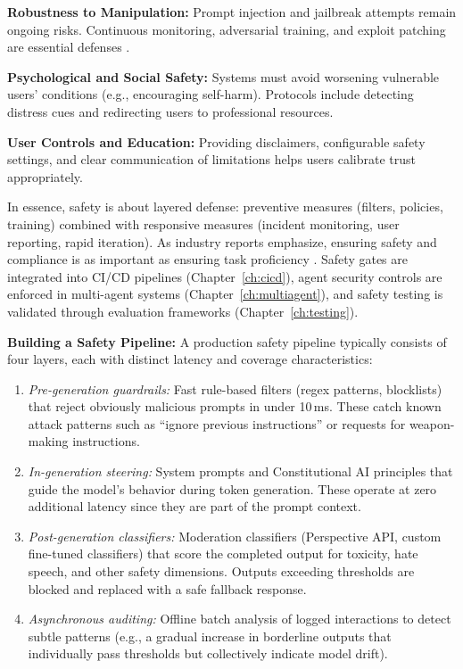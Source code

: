 \textbf{Robustness to Manipulation:} Prompt injection and jailbreak attempts remain ongoing risks. Continuous monitoring, adversarial training, and exploit patching are essential defenses \cite{edpb2022}.

\textbf{Psychological and Social Safety:} Systems must avoid worsening vulnerable users' conditions (e.g., encouraging self-harm). Protocols include detecting distress cues and redirecting users to professional resources.

\textbf{User Controls and Education:} Providing disclaimers, configurable safety settings, and clear communication of limitations helps users calibrate trust appropriately.

In essence, safety is about layered defense: preventive measures (filters, policies, training) combined with responsive measures (incident monitoring, user reporting, rapid iteration). As industry reports emphasize, ensuring safety and compliance is as important as ensuring task proficiency \cite{bcg2023}. Safety gates are integrated into CI/CD pipelines (Chapter~\ref{ch:cicd}), agent security controls are enforced in multi-agent systems (Chapter~\ref{ch:multiagent}), and safety testing is validated through evaluation frameworks (Chapter~\ref{ch:testing}).

\textbf{Building a Safety Pipeline:} A production safety pipeline typically consists of four layers, each with distinct latency and coverage characteristics:
\begin{enumerate}
    \item \emph{Pre-generation guardrails:} Fast rule-based filters (regex patterns, blocklists) that reject obviously malicious prompts in under 10\,ms. These catch known attack patterns such as ``ignore previous instructions'' or requests for weapon-making instructions.
    \item \emph{In-generation steering:} System prompts and Constitutional AI principles that guide the model's behavior during token generation. These operate at zero additional latency since they are part of the prompt context.
    \item \emph{Post-generation classifiers:} Moderation classifiers (Perspective API, custom fine-tuned classifiers) that score the completed output for toxicity, hate speech, and other safety dimensions. Outputs exceeding thresholds are blocked and replaced with a safe fallback response.
    \item \emph{Asynchronous auditing:} Offline batch analysis of logged interactions to detect subtle patterns (e.g., a gradual increase in borderline outputs that individually pass thresholds but collectively indicate model drift).
\end{enumerate}

